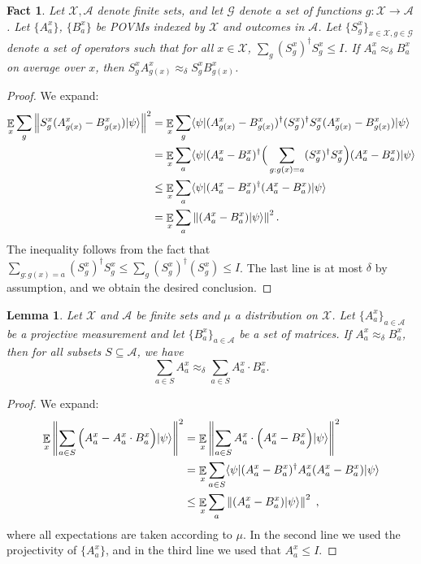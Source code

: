 \documentclass[11pt]{article}
\newtheorem{lemma}[theorem]{Lemma}
\newtheorem{fact}[theorem]{Fact}
\theoremstyle{definition}
\newcommand{\ket}[1]{|#1\rangle}
\newcommand{\bra}[1]{\langle#1|}
\newcommand{\Id}{\ensuremath{I}}
\newcommand{\mX}{\ensuremath{\mathcal{X}}}
\newcommand{\norm}[1]{\left\| {#1} \right\|}
\newcommand{\E}{\mathop{\mathbb{E}}\displaylimits}
\begin{document}
\begin{fact}
\label{fact:add-a-proj2}
Let $\mathcal{X},\mathcal{A}$ denote finite sets, and let $\mathcal{G}$ denote a set of functions $g: \mathcal{X} \to \mathcal{A}$. Let $\{A^x_a \}$, $\{B^x_a\}$ be POVMs indexed by $\mathcal{X}$ and outcomes in $\mathcal{A}$. Let $\{ S_g^x \}_{x\in \mathcal{X}, g\in\mathcal{G}}$ denote a set of operators such that for all $x \in \mathcal{X}$, $\sum_g (S_g^x)^\dagger S_g^x \leq \Id$. 
If $A^x_a \approx_\delta B^x_a$ on average over $x$, then $S_g^x A^x_{g(x)} \approx_\delta S_g^x B^x_{g(x)}$. 
\end{fact}
\begin{proof}
	We expand:
	\begin{align*}
		\E_x \sum_g \norm{ S^x_g (A^x_{g(x)} - B^x_{g(x)}) \ket{\psi}}^2 &= \E_x \sum_g \bra{\psi} (A^x_{g(x)} - B^x_{g(x)})^\dagger  (S_g^x)^\dagger S_g^x (A^x_{g(x)} - B^x_{g(x)}) \ket{\psi} \\
		&= \E_x \sum_a \bra{\psi} (A^x_a - B^x_a)^\dagger  \Big(\sum_{g: g(x) = a} (S_g^x)^\dagger S_g^x \Big) (A^x_a - B^x_a) \ket{\psi} \\
		&\leq \E_x \sum_a \bra{\psi} (A^x_a - B^x_a)^\dagger (A^x_a - B^x_a) \ket{\psi} \\
		&= \E_x \sum_a \norm{ (A^x_a - B^x_a) \ket{\psi} }^2.
	\end{align*}
	The inequality follows from the fact that $\sum_{g: g(x) = a} (S_g^x)^\dagger S_g^x \leq \sum_g (S_g^x)^\dagger (S_g^x) \leq \Id$. The last line is at most $\delta$ by assumption, and we obtain the desired conclusion.
\end{proof}


\begin{lemma}
\label{lem:cool-closeness-fact}
Let $\mathcal{X}$ and $\mathcal{A}$ be finite sets and $\mu$ a distribution on $\mX$. Let $\{A^x_a\}_{a \in \mathcal{A}}$ be a projective measurement and let $\{B^x_a\}_{a \in \mathcal{A}}$ be a set of matrices. If $A^x_a \approx_\delta B^x_a$, then for all subsets $S \subseteq \mathcal{A}$, we have
\[
	\sum_{a \in S} A^x_a \approx_\delta \sum_{a \in S} A^x_a \cdot B^x_a.
\]
\end{lemma}
\begin{proof}
We expand:
\begin{align*}
	\E_x \norm{ \sum_{a \in S} \Big(A^x_a - A^x_a \cdot B^x_a\Big) \ket{\psi}}^2 &= \E_x \norm{ \sum_{a \in S} A^x_a \cdot \Big(A^x_a - B^x_a\Big) \ket{\psi}}^2 \\
	&= \E_x \sum_{a \in S} \bra{\psi} (A^x_a - B^x_a)^\dagger A^x_a (A^x_a - B^x_a) \ket{\psi} \\
	&\leq \E_x \sum_a \norm{ (A^x_a -  B^x_a) \ket{\psi}}^2\;,
\end{align*}
where all expectations are taken according to $\mu$. 
In the second line we used the projectivity of $\{ A^x_a \}$, and in the third line we used that $A^x_a \leq \Id$.
\end{proof}
\end{document}
